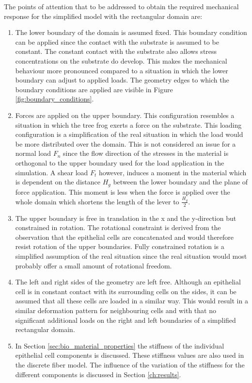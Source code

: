 \qquad The points of attention that to be addressed to obtain the required mechanical response for the simplified model with the rectangular domain are:
\begin{enumerate}
    \item The lower boundary of the domain is assumed fixed. This boundary condition can be applied since the contact with the substrate is assumed to be constant. The constant contact with the substrate also allows stress concentrations on the substrate do develop. This makes the mechanical behaviour more pronounced compared to a situation in which the lower boundary can adjust to applied loads. The geometry edges to which the boundary conditions are applied are visible in Figure \ref{fig:boundary_conditions}.
    \item Forces are applied on the upper boundary. This configuration resembles a situation in which the tree frog exerts a force on the substrate. This loading configuration is a simplification of the real situation in which the load would be more distributed over the domain. This is not considered an issue for a normal load $F_n$ since the flow direction of the stresses in the material is orthogonal to the upper boundary used for the load application in the simulation. A shear load $F_t$ however, induces a moment in the material which is dependent on the distance $H_g$ between the lower boundary and the plane of force application. This moment is less when the force is applied over the whole domain which shortens the length of the lever to $\frac{H_g}{2}$.
    \item The upper boundary is free in translation in the x and the y-direction but constrained in rotation. The rotational constraint is derived from the observation that the epithelial cells are concatenated and would therefore resist rotation of the upper boundaries. Fully constrained rotation is a simplified assumption of the real situation since the real situation would most probably offer a small amount of rotational freedom.
    \item The left and right sides of the geometry are left free. Although an epithelial cell is in constant contact with its surrounding cells on the sides, it can be assumed that all these cells are loaded in a similar way. This would result in a similar deformation pattern for neighbouring cells and with that no significant additional loads on the right and left boundaries of a simplified rectangular domain. 
    \item In Section \ref{sec:bio_material_properties} the stiffness of the individual epithelial cell components is discussed. These stiffness values are also used in the discrete fiber model. The influence of the variation of the stiffness for the different components is discussed in Section \ref{ch:results}.

\end{enumerate}
